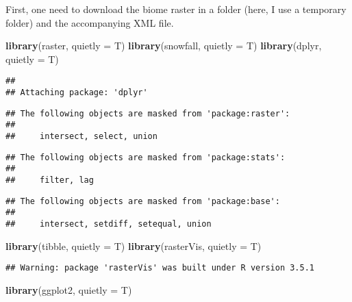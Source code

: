 \documentclass[]{article}
\newenvironment{Shaded}{\begin{snugshade}}{\end{snugshade}}
\newcommand{\KeywordTok}[1]{\textcolor[rgb]{0.13,0.29,0.53}{\textbf{#1}}}
\newcommand{\DataTypeTok}[1]{\textcolor[rgb]{0.13,0.29,0.53}{#1}}
\newcommand{\NormalTok}[1]{#1}
\begin{document}
First, one need to download the biome raster in a folder (here, I use a
temporary folder) and the accompanying XML file.

\begin{Shaded}
\begin{Highlighting}[]
\KeywordTok{library}\NormalTok{(raster, }\DataTypeTok{quietly =}\NormalTok{ T)}
\KeywordTok{library}\NormalTok{(snowfall, }\DataTypeTok{quietly =}\NormalTok{ T)}
\KeywordTok{library}\NormalTok{(dplyr, }\DataTypeTok{quietly =}\NormalTok{ T)}
\end{Highlighting}
\end{Shaded}

\begin{verbatim}
## 
## Attaching package: 'dplyr'
\end{verbatim}

\begin{verbatim}
## The following objects are masked from 'package:raster':
## 
##     intersect, select, union
\end{verbatim}

\begin{verbatim}
## The following objects are masked from 'package:stats':
## 
##     filter, lag
\end{verbatim}

\begin{verbatim}
## The following objects are masked from 'package:base':
## 
##     intersect, setdiff, setequal, union
\end{verbatim}

\begin{Shaded}
\begin{Highlighting}[]
\KeywordTok{library}\NormalTok{(tibble, }\DataTypeTok{quietly =}\NormalTok{ T)}
\KeywordTok{library}\NormalTok{(rasterVis, }\DataTypeTok{quietly =}\NormalTok{ T)}
\end{Highlighting}
\end{Shaded}

\begin{verbatim}
## Warning: package 'rasterVis' was built under R version 3.5.1
\end{verbatim}

\begin{Shaded}
\begin{Highlighting}[]
\KeywordTok{library}\NormalTok{(ggplot2, }\DataTypeTok{quietly =}\NormalTok{ T)}
\end{Highlighting}
\end{Shaded}
\end{document}
